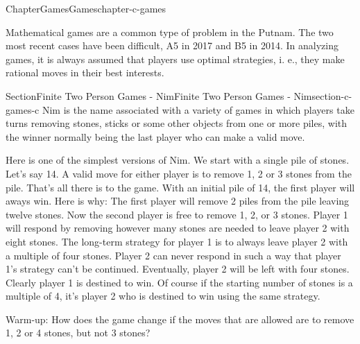 \documentclass[oneside,10pt,]{book}
\numberwithin{equation}{section}
\begin{document}
%
%
\typeout{************************************************}
\typeout{************************************************}
%
\begin{chapterptx}{Chapter}{Games}{}{Games}{}{}{chapter-c-games}
\renewcommand*{\chaptername}{Chapter}
\begin{introduction}{}%
Mathematical games are a common type of problem in the Putnam. The two most recent cases have been difficult, A5 in 2017 and B5 in 2014.  In analyzing games, it is  always assumed that players use optimal strategies, i. e., they make rational moves in their best interests.%
\end{introduction}%
%
%
\typeout{************************************************}
\typeout{************************************************}
%
\begin{sectionptx}{Section}{Finite Two Person Games - Nim}{}{Finite Two Person Games - Nim}{}{}{section-c-games-c}
%
Nim is the name associated with a variety of games in which players take turns removing stones, sticks or some other objects from one or more piles, with the winner normally being the last player who can make a valid move.%
\par
Here is one of the simplest versions of Nim. We start with a single pile of stones. Let's say 14.  A valid move for either player is to remove 1, 2 or 3 stones from the pile. That's all there is to the game.  With an initial pile of 14, the first player will aways win.  Here is why:  The first player will remove 2 piles from the pile leaving twelve stones.   Now the second player is free to remove 1, 2, or 3 stones.  Player 1 will respond by removing however many stones are needed to leave player 2 with eight stones.  The long-term strategy for player 1 is to always leave player 2 with a multiple of four stones.   Player 2 can never respond in such a way that player 1's strategy can't be continued.  Eventually, player 2 will be left with four stones.   Clearly player 1 is destined to win.   Of course if the starting number of stones is a multiple of 4, it's player 2 who is destined to win using the same strategy.%
\par
Warm-up:  How does the game change if the moves that are allowed are to remove 1, 2 or 4 stones, but not 3 stones?%
\end{sectionptx}
%
%
\typeout{************************************************}
\typeout{************************************************}

\end{chapterptx}
\end{document}
